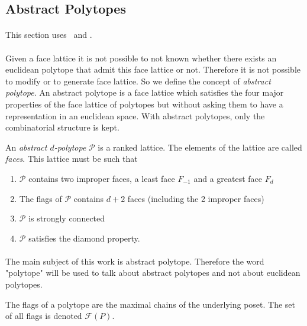 \cleardoublepage{}
\subsection{Abstract Polytopes}

\paragraph{}
This section uses~\cite{incidenceGeometry} and \cite{abstractRegularPolytopes}.

\paragraph{}
Given a face lattice it is not possible to not known whether there exists an euclidean polytope that admit this face lattice or not. Therefore it is not possible to modify or to generate face lattice. So we define the concept of \textit{abstract polytope}. An abstract polytope is a face lattice which satisfies the four major properties of the face lattice of polytopes but without asking them to have a representation in an euclidean space. With abstract polytopes, only the combinatorial structure is kept.

\begin{definition}
  An \textit{abstract $d$-polytope} $\mathcal P$ is a ranked lattice. The elements of the lattice are called \textit{faces}. This lattice must be such that
  \begin{enumerate}
    \item $\mathcal P$ contains two improper faces, a least face $F_{-1}$ and a greatest face $F_d$
    \item The flags of $\mathcal P$ contains $d + 2$ faces (including the 2 improper faces)
    \item $\mathcal P$ is strongly connected
    \item $\mathcal P$ satisfies the diamond property.
  \end{enumerate}
\end{definition}

\paragraph{}
The main subject of this work is abstract polytope. Therefore the word "polytope" will be used to talk about abstract polytopes and not about euclidean polytopes.

\begin{definition}
  The flags of a polytope are the maximal chains of the underlying poset. The set of all flags is denoted $\mathcal F(P)$.
\end{definition}

